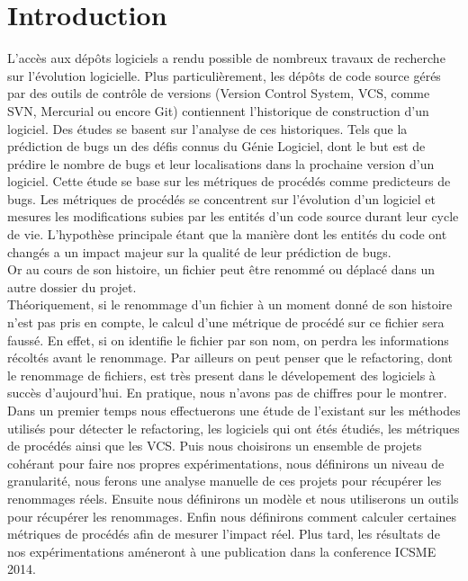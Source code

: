 \section{Introduction}
\label{sec:intro}

L'accès aux dépôts logiciels a rendu possible de nombreux travaux de recherche sur l'évolution logicielle. Plus particulièrement, les dépôts de code source gérés par des outils de contrôle de versions (Version Control System, VCS, comme SVN, Mercurial ou encore Git) contiennent l'historique de construction d'un logiciel. Des études se basent sur l'analyse de ces historiques. Tels que la prédiction de bugs un des défis connus du Génie Logiciel, dont le but est de prédire le nombre de bugs et leur localisations dans la prochaine version d'un logiciel. Cette étude se base sur les métriques de procédés comme predicteurs de bugs. Les métriques de procédés se concentrent sur l'évolution d'un logiciel et mesures les modifications subies par les entités d'un code source durant leur cycle de vie. L'hypothèse principale étant que la manière dont les entités du code ont changés a un impact majeur sur la qualité de leur prédiction de bugs.\\
Or au cours de son histoire, un fichier peut être renommé ou déplacé dans un autre dossier du projet.\\
Théoriquement, si le renommage d'un fichier à un moment donné de son histoire n'est pas pris en compte, le calcul d'une métrique de procédé sur ce fichier sera faussé. En effet, si on identifie le fichier par son nom, on perdra les informations récoltés avant le renommage. Par ailleurs on peut penser que le refactoring, dont le renommage de fichiers, est très present dans le dévelopement des logiciels à succès d'aujourd'hui. En pratique, nous n'avons pas de chiffres pour le montrer.\\ 
Dans un premier temps nous effectuerons une étude de l'existant sur les méthodes utilisés pour détecter le refactoring, les logiciels qui ont étés étudiés, les métriques de procédés ainsi que les VCS. Puis nous choisirons un ensemble de projets cohérant pour faire nos propres expérimentations, nous définirons un niveau de granularité, nous ferons une analyse manuelle de ces projets pour récupérer les renommages réels. Ensuite nous définirons un modèle et nous utiliserons un outils pour récupérer les renommages. Enfin nous définirons comment calculer certaines métriques de procédés afin de mesurer l'impact réel. Plus tard, les résultats de nos expérimentations améneront à une publication dans la conference ICSME 2014.\\

